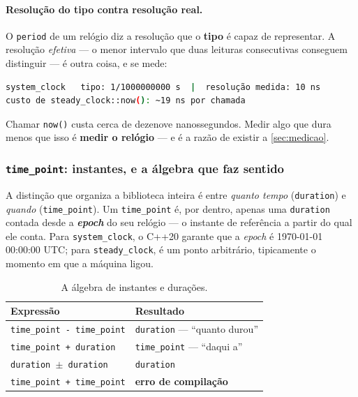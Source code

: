 \paragraph{Resolução do tipo contra resolução real.} O \texttt{period} de um
relógio diz a resolução que o \textbf{tipo} é capaz de representar. A resolução
\emph{efetiva} --- o menor intervalo que duas leituras consecutivas conseguem
distinguir --- é outra coisa, e se mede:

\begin{lstlisting}[style=bt, language=bash,
    caption={Saída de \texttt{src/chrono/}: o tipo promete nanossegundos; a
             realidade é outra.}]
system_clock   tipo: 1/1000000000 s  |  resolução medida: 10 ns
custo de steady_clock::now(): ~19 ns por chamada
\end{lstlisting}

Chamar \texttt{now()} custa cerca de dezenove nanossegundos. Medir algo que dura
menos que isso é \textbf{medir o relógio} --- e é a razão de existir a
\cref{sec:medicao}.

\subsubsection{\texttt{time\_point}: instantes, e a álgebra que faz sentido}

A distinção que organiza a biblioteca inteira é entre \emph{quanto tempo}
(\texttt{duration}) e \emph{quando} (\texttt{time\_point}). Um
\texttt{time\_point} é, por dentro, apenas uma \texttt{duration} contada desde a
\textbf{\emph{epoch}} do seu relógio --- o instante de referência a partir do
qual ele conta. Para \texttt{system\_clock}, o C++20 garante que a \emph{epoch}
é 1970-01-01 00:00:00 UTC; para \texttt{steady\_clock}, é um ponto arbitrário,
tipicamente o momento em que a máquina ligou.

\begin{table}[htbp]
\centering
\caption{A álgebra de instantes e durações.}
\label{tab:algebra-tempo}
\footnotesize
\begin{tabular}{@{}ll@{}}
\toprule
\textbf{Expressão} & \textbf{Resultado} \\
\midrule
\texttt{time\_point - time\_point} & \texttt{duration} --- ``quanto durou'' \\
\texttt{time\_point + duration}    & \texttt{time\_point} --- ``daqui a'' \\
\texttt{duration $\pm$ duration}   & \texttt{duration} \\
\texttt{time\_point + time\_point} & \textbf{erro de compilação} \\
\bottomrule
\end{tabular}
\end{table}

